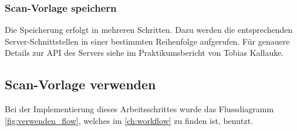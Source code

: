 \documentclass[notables, nomenclature, oneside, 150]{HSMW-Thesis}
\begin{document}
			\subsubsection*{Scan-Vorlage speichern}
				Die Speicherung erfolgt in mehreren Schritten. Dazu werden die entsprechenden Server-Schnittstellen in einer bestimmten Reihenfolge aufgerufen. Für genauere Details zur API des Servers siehe im Praktikumsbericht von Tobias Kallauke.
				
			
			
		\newpage
		\subsection{Scan-Vorlage verwenden}
			Bei der Implementierung dieses Arbeitsschrittes wurde das Flussdiagramm \ref{fig:verwenden_flow}, welches im \autoref{ch:workflow} zu finden ist, benutzt.
			
\end{document}
